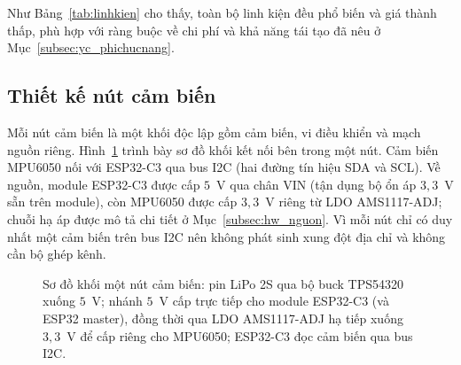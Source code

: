 \documentclass[../DoAn.tex]{subfiles}
\begin{document}
Như Bảng~\ref{tab:linhkien} cho thấy, toàn bộ linh kiện đều phổ biến và giá thành
thấp, phù hợp với ràng buộc về chi phí và khả năng tái tạo đã nêu ở
Mục~\ref{subsec:yc_phichucnang}.

\subsection{Thiết kế nút cảm biến}
\label{subsec:hw_node}
Mỗi nút cảm biến là một khối độc lập gồm cảm biến, vi điều khiển và mạch nguồn
riêng. Hình~\ref{fig:nodewiring} trình bày sơ đồ khối kết nối bên trong một nút. Cảm
biến MPU6050 nối với ESP32-C3 qua bus I2C (hai đường tín hiệu SDA và SCL). Về nguồn,
module ESP32-C3 được cấp $5$~V qua chân VIN (tận dụng bộ ổn áp $3{,}3$~V sẵn trên
module), còn MPU6050 được cấp $3{,}3$~V riêng từ LDO AMS1117-ADJ; chuỗi hạ áp được
mô tả chi tiết ở Mục~\ref{subsec:hw_nguon}. Vì mỗi nút chỉ có duy nhất một cảm
biến trên bus I2C nên không phát sinh xung đột địa chỉ và không cần bộ ghép kênh.

\begin{figure}[h]
    \centering
    \caption{Sơ đồ khối một nút cảm biến: pin LiPo 2S qua bộ buck TPS54320 xuống $5$~V; nhánh $5$~V cấp trực tiếp cho module ESP32-C3 (và ESP32 master), đồng thời qua LDO AMS1117-ADJ hạ tiếp xuống $3{,}3$~V để cấp riêng cho MPU6050; ESP32-C3 đọc cảm biến qua bus I2C.}
    \label{fig:nodewiring}
\end{figure}
\end{document}
